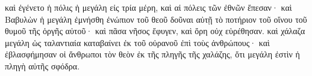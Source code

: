 \documentclass{openreader}
\begin{document}
καὶ ἐγένετο ἡ πόλις ἡ μεγάλη εἰς τρία μέρη, καὶ αἱ πόλεις τῶν ἐθνῶν ἔπεσαν· καὶ Βαβυλὼν ἡ μεγάλη ἐμνήσθη ἐνώπιον τοῦ θεοῦ δοῦναι αὐτῇ τὸ ποτήριον τοῦ οἴνου τοῦ θυμοῦ τῆς ὀργῆς αὐτοῦ· 
καὶ πᾶσα νῆσος ἔφυγεν, καὶ ὄρη οὐχ εὑρέθησαν. 
καὶ χάλαζα μεγάλη ὡς ταλαντιαία καταβαίνει ἐκ τοῦ οὐρανοῦ ἐπὶ τοὺς ἀνθρώπους· καὶ ἐβλασφήμησαν οἱ ἄνθρωποι τὸν θεὸν ἐκ τῆς πληγῆς τῆς χαλάζης, ὅτι μεγάλη ἐστὶν ἡ πληγὴ αὐτῆς σφόδρα. 
\end{document}
